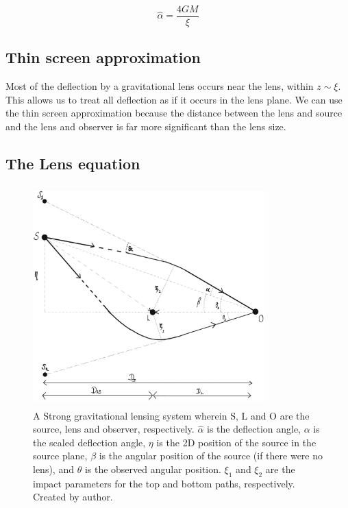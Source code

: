 \documentclass[12pt]{report}
\begin{document}
\begin{equation*}
    \hat{\alpha} = \dfrac{4GM}{\xi}
\end{equation*}

\subsection{Thin screen approximation}

Most of the deflection by a gravitational lens occurs near the lens, within $z \sim \xi$. This allows us to treat all deflection as if it occurs in the lens plane. We can use the thin screen approximation because the distance between the lens and source and the lens and observer is far more significant than the lens size.

\newpage

\subsection{The Lens equation}

\begin{figure}[h]
    \centering
    \includegraphics[width =0.8\textwidth, height = 8.5cm]{figure_1.jpeg}
    \caption{A Strong gravitational lensing system wherein S, L and O are the source, lens and observer, respectively. $\hat{\alpha}$ is the deflection angle, $\alpha$ is the scaled deflection angle, $\eta$ is the 2D position of the source in the source plane, $\beta$ is the angular position of the source (if there were no lens), and $\theta$ is the observed angular position. $\xi_{1}$ and $\xi_{2}$ are the impact parameters for the top and bottom paths, respectively. Created by author.}
    \label{fig:Figure2}
\end{figure}
\end{document}
